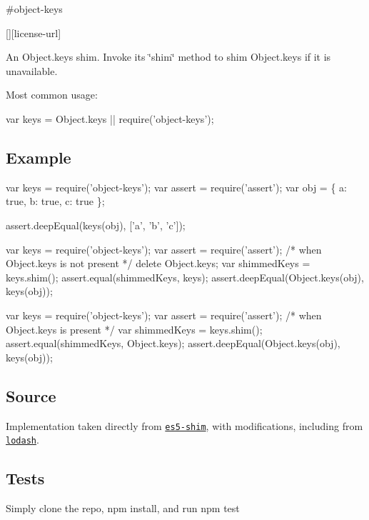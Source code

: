 \#object-\/keys \textsuperscript{\href{https://npmjs.org/package/object-keys}{\tt }}

\href{https://travis-ci.org/ljharb/object-keys}{\tt } \href{https://david-dm.org/ljharb/object-keys}{\tt } \href{https://david-dm.org/ljharb/object-keys#info=devDependencies}{\tt } \mbox{[}\mbox{]}\mbox{[}license-\/url\mbox{]} \href{http://npm-stat.com/charts.html?package=object-keys}{\tt }

\href{https://npmjs.org/package/object-keys}{\tt }

\href{https://ci.testling.com/ljharb/object-keys}{\tt }

An Object.\+keys shim. Invoke its \char`\"{}shim\char`\"{} method to shim Object.\+keys if it is unavailable.

Most common usage\+: 
\begin{DoxyCode}
var keys = Object.keys || require('object-keys');
\end{DoxyCode}


\subsection*{Example}


\begin{DoxyCode}
var keys = require('object-keys');
var assert = require('assert');
var obj = \{
    a: true,
    b: true,
    c: true
\};

assert.deepEqual(keys(obj), ['a', 'b', 'c']);
\end{DoxyCode}



\begin{DoxyCode}
var keys = require('object-keys');
var assert = require('assert');
/* when Object.keys is not present */
delete Object.keys;
var shimmedKeys = keys.shim();
assert.equal(shimmedKeys, keys);
assert.deepEqual(Object.keys(obj), keys(obj));
\end{DoxyCode}



\begin{DoxyCode}
var keys = require('object-keys');
var assert = require('assert');
/* when Object.keys is present */
var shimmedKeys = keys.shim();
assert.equal(shimmedKeys, Object.keys);
assert.deepEqual(Object.keys(obj), keys(obj));
\end{DoxyCode}


\subsection*{Source}

Implementation taken directly from \href{https://github.com/es-shims/es5-shim/blob/master/es5-shim.js#L542-589}{\tt es5-\/shim}, with modifications, including from \href{https://github.com/lodash/lodash}{\tt lodash}.

\subsection*{Tests}

Simply clone the repo, {\ttfamily npm install}, and run {\ttfamily npm test} 